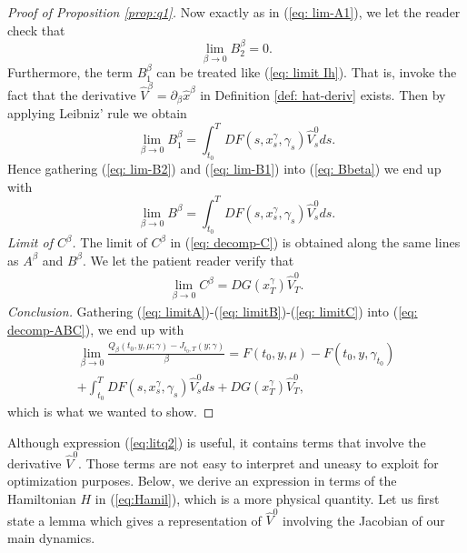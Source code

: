 \documentclass[12pt,reqno]{amsart}
\numberwithin{equation}{section}  %
\newcommand{\1}{{\bf 1}}
\newcommand{\2}{{\bf 2}}
\newcommand{\ga}{\gamma}
\theoremstyle{remark}
\theoremstyle{remark}
\begin{document}
\begin{proof}[Proof of Proposition \ref{prop:q1}]
Now exactly as in (\ref{eq: lim-A1}), we let the reader check that
\begin{equation}
    \lim_{\beta\to 0}B_{2}^{\beta}=0. \label{eq: lim-B2}
\end{equation}
Furthermore, the term $B_{1}^{\beta}$ can be treated like (\ref{eq: limit Ih}). That is, invoke the fact that the derivative $\widehat{V}^{\beta}=\partial_{\beta}\hat{x}^{\beta}$ in Definition \ref{def: hat-deriv} exists. Then by applying Leibniz' rule we obtain
\begin{equation}\label{eq: lim-B1}\lim_{\beta \to 0}B^{\beta}_{1}=\int_{t_0}^{T}DF(s,x_{s}^{\ga},\ga_{s})\widehat{V}^{0}_{s}ds.\end{equation}
Hence gathering (\ref{eq: lim-B2}) and (\ref{eq: lim-B1}) into (\ref{eq: Bbeta}) we end up with
\begin{equation}\label{eq: limitB}
    \lim_{\beta \to 0}B^{\beta}=\int_{t_0}^{T}DF(s,x_{s}^{\ga},\ga_{s})\widehat{V}_{s}^{0}ds.
\end{equation}
 \smallskip
\noindent
\textit{Limit of $C^{\beta}$.} The limit of $C^{\beta}$ in (\ref{eq: decomp-C}) is obtained along the same lines as $A^{\beta}$ and $B^{\beta}$. We let the patient reader verify that
\begin{equation}\label{eq: limitC}
    \begin{aligned}
        \lim_{\beta \to 0}C^{\beta}=DG(x_{T}^{\ga})\widehat{V}_{T}^{0}.
    \end{aligned}
\end{equation}
 \smallskip
\noindent
\textit{Conclusion.} Gathering (\ref{eq: limitA})-(\ref{eq: limitB})-(\ref{eq: limitC}) into (\ref{eq: decomp-ABC}), we end up with
\begin{multline*}
    \lim_{\beta \to 0}\frac{Q_{\beta}(t_0,y,\mu;\ga)-J_{t_0,T}(y;\ga)}{\beta}=F(t_0,y,\mu)-F(t_0,y,\ga_{t_0})\\+\int_{t_0}^{T}DF(s,x_{s}^{\ga},\ga_{s})\widehat{V}_{s}^{0}ds  +DG(x_{T}^{\ga})\widehat{V}_{T}^{0},
\end{multline*}
which is what we wanted to show.
\end{proof}
Although expression (\ref{eq:litq2}) is useful, it contains terms that involve the derivative $\widehat{V}^{0}$. Those terms are not easy to interpret and uneasy to exploit for optimization purposes. Below, we derive an expression in terms of the Hamiltonian $H$ in (\ref{eq:Hamil}), which is a more physical quantity. Let us first state a lemma which gives a representation of $\widehat{V}^{0}$ involving the Jacobian of our main dynamics.
\end{document}
